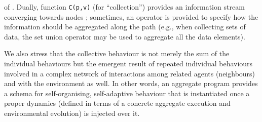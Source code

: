  of .
%
Dually, function \lstinline|C(p,v)| (for ``collection'') provides an information stream
 converging towards nodes ; sometimes, an operator is provided to specify how the information should be aggregated along the path (e.g., when collecting sets of data, the set union operator may be used to aggregate all the data elements).
%

We also stress that the collective behaviour 
 is not merely the sum of the individual behaviours
 but the emergent result of 
 repeated individual behaviours involved
 in a complex network of interactions 
 among related agents (neighbours) 
 and with the environment as well.
%
In other words, an aggregate program 
 provides a schema for self-organising, self-adaptive behaviour
 that is instantiated once a proper dynamics 
 (defined in terms of a concrete aggregate execution and environmental evolution)
 is injected over it.

%
%



